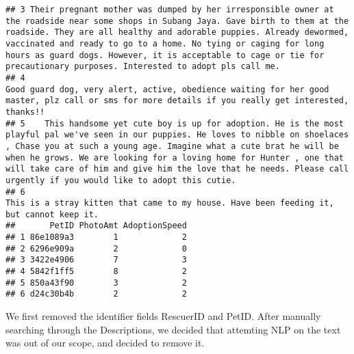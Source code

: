 \documentclass[
]{article}
\begin{document}
\begin{verbatim}
## 3 Their pregnant mother was dumped by her irresponsible owner at the roadside near some shops in Subang Jaya. Gave birth to them at the roadside. They are all healthy and adorable puppies. Already dewormed, vaccinated and ready to go to a home. No tying or caging for long hours as guard dogs. However, it is acceptable to cage or tie for precautionary purposes. Interested to adopt pls call me.
## 4                                                                                                                                                                                                                                                        Good guard dog, very alert, active, obedience waiting for her good master, plz call or sms for more details if you really get interested, thanks!!
## 5    This handsome yet cute boy is up for adoption. He is the most playful pal we've seen in our puppies. He loves to nibble on shoelaces , Chase you at such a young age. Imagine what a cute brat he will be when he grows. We are looking for a loving home for Hunter , one that will take care of him and give him the love that he needs. Please call urgently if you would like to adopt this cutie.
## 6                                                                                                                                                                                                                                                                                                                   This is a stray kitten that came to my house. Have been feeding it, but cannot keep it.
##       PetID PhotoAmt AdoptionSpeed
## 1 86e1089a3        1             2
## 2 6296e909a        2             0
## 3 3422e4906        7             3
## 4 5842f1ff5        8             2
## 5 850a43f90        3             2
## 6 d24c30b4b        2             2
\end{verbatim}

We first removed the identifier fields RescuerID and PetID. After
manually searching through the Descriptions, we decided that attemting
NLP on the text was out of our scope, and decided to remove it.
\end{document}
